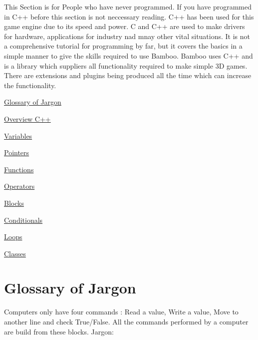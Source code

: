 This Section is for People who have never programmed. If you have programmed in C++ before this section is not neccessary reading. C++ has been used for this game engine due to its speed and power. C and C++ are used to make drivers for hardware, applications for industry nad mnay other vital situations. It is not a comprehensive tutorial for programming by far, but it covers the basics in a simple manner to give the skills required to use Bamboo. Bamboo uses C++ and is a library which suppliers all functionality required to make simple 3D games. There are extensions and plugins being produced all the time which can increase the functionality.
\begin{DoxyEnumerate}
\item \hyperlink{_programming_basics_ProgrammingBasicsGlossary}{Glossary of Jargon}
\item \hyperlink{_programming_basics_BasicsPageStructure}{Overview C++}
\item \hyperlink{_programming_basics_BasicsPageVariables}{Variables}
\item \hyperlink{_programming_basics_BasicsPagePointers}{Pointers}
\item \hyperlink{_programming_basics_BasicsPageFunctions}{Functions}
\item \hyperlink{_programming_basics_BasicsPageOperators}{Operators}
\item \hyperlink{_programming_basics_BasicsPageMisc}{Blocks}
\item \hyperlink{_programming_basics_BasicsPageConditionals}{Conditionals}
\item \hyperlink{_programming_basics_BasicsPageLoops}{Loops}
\item \hyperlink{_programming_basics_BasicsPageClasses}{Classes}
\end{DoxyEnumerate}\hypertarget{_programming_basics_ProgrammingBasicsGlossary}{}\section{Glossary of Jargon}\label{_programming_basics_ProgrammingBasicsGlossary}
Computers only have four commands : Read a value, Write a value, Move to another line and check True/False. All the commands performed by a computer are build from these blocks. Jargon:
